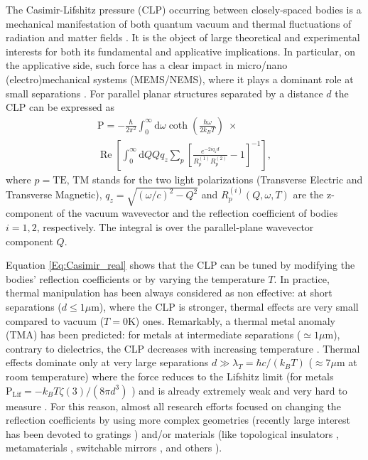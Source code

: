 \documentclass[aps,pra,superscriptaddress,amsmath,amssymb,showpacs,twocolumn,notitlepage]{revtex4-1}
\DeclareMathOperator{\Rea}{Re}
\begin{document}
The Casimir-Lifshitz pressure (CLP) occurring between closely-spaced bodies is a mechanical manifestation of both quantum vacuum and thermal fluctuations of radiation and matter fields \cite{Casimir,Lif56,DLP61}. It is the object of large theoretical and experimental interests \cite{CasimirBook} for both its fundamental and applicative implications. In particular, on the applicative side, such force has a clear impact in micro/nano (electro)mechanical systems (MEMS/NEMS), where it plays a dominant role at small separations \cite{Chan2001}. 
For parallel planar structures separated by a distance $d$ the CLP can be expressed as \cite{DLP61}    
%
\begin{multline}\label{Eq:Casimir_real}
\textrm{P}=-\frac{\hbar}{2\pi^2}  \int_{0}^{\infty}\textrm{d}\omega \coth{\left(\frac{\hbar\omega}{2k_BT}\right)}\;\times\\
\Rea\left[ \int_0^{\infty}\textrm{d}QQq_z\sum_{p}\left[ \frac{e^{-2 i q_z d}}{ R_p^{(1)}R_p^{(2)}}-1 \right]^{-1} \right],
\end{multline}
%
where $p=\textrm{TE, TM}$ stands for the two light polarizations (Transverse Electric and Transverse Magnetic), $q_z  = \sqrt{(\omega/c)^2-Q^2}$  and $R_p^{(i)}(Q,\omega,T)$ are the 
z-component of the vacuum wavevector and the reflection coefficient of bodies $i=1,2$, respectively. The integral is over the parallel-plane wavevector component $Q$. 

Equation \eqref{Eq:Casimir_real} shows that the CLP can be tuned by modifying the bodies' reflection coefficients or by varying the temperature $T$. In practice, thermal manipulation has been always considered as non effective: at short separations  ($d\leq1\mu$m), where the CLP is stronger, thermal effects are very small compared to vacuum ($T=0$K) ones. Remarkably, a thermal metal anomaly (TMA) has been predicted: for metals at intermediate separations ($\simeq 1\mu$m), contrary to dielectrics, the CLP decreases with increasing temperature \cite{Sernelius2000}. Thermal effects dominate only at very large separations $d\gg\lambda_T=\hbar c/(k_B T)$  ($\approx7\mu$m at room temperature) where the force reduces to the Lifshitz limit (for metals $\textrm{P}_{\textrm{Lif}}=-k_BT\zeta(3)/(8\pi d^3)$ \cite{Lif56}) and is already extremely weak and very hard to measure \cite{Antezza04,Harber05,Antezza05,Obrecht07,Lamoreaux}. For this reason, almost all research efforts focused on changing the reflection coefficients by using more complex geometries (recently large interest has been devoted to gratings \cite{Chan08, Lambrecht08,Mohideen2002,Guerout13,Decca13,Chan13,Messina15}) and/or materials (like topological insulators \cite{Grushin11}, metamaterials \cite{Milonni08}, switchable mirrors \cite{Iannuzzi04}, and others \cite{RMP}).
\end{document}
